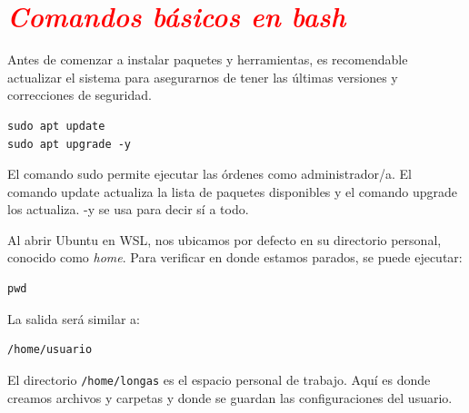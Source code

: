 \documentclass[12pt]{article}
\begin{document}
\section*{\textcolor{red}{\textit{Comandos básicos en bash}}}

Antes de comenzar a instalar paquetes y herramientas, es recomendable actualizar el sistema para 
asegurarnos de tener las últimas versiones y correcciones de seguridad.
\begin{lstlisting}
sudo apt update
sudo apt upgrade -y
\end{lstlisting}
El comando sudo permite ejecutar las órdenes como administrador/a. El comando update 
actualiza la lista de paquetes disponibles y el comando upgrade los actualiza. -y se usa para decir sí a todo. 


Al abrir Ubuntu en WSL, nos ubicamos por defecto en su directorio personal, 
conocido como \textit{home}. Para verificar en donde estamos parados, se puede ejecutar:
\begin{lstlisting}
pwd
\end{lstlisting}
La salida será similar a:
\begin{lstlisting}
/home/usuario
\end{lstlisting}
El directorio \texttt{/home/longas} es el espacio personal de trabajo. Aquí es donde creamos archivos y 
carpetas y donde se guardan las configuraciones del usuario.
\end{document}
